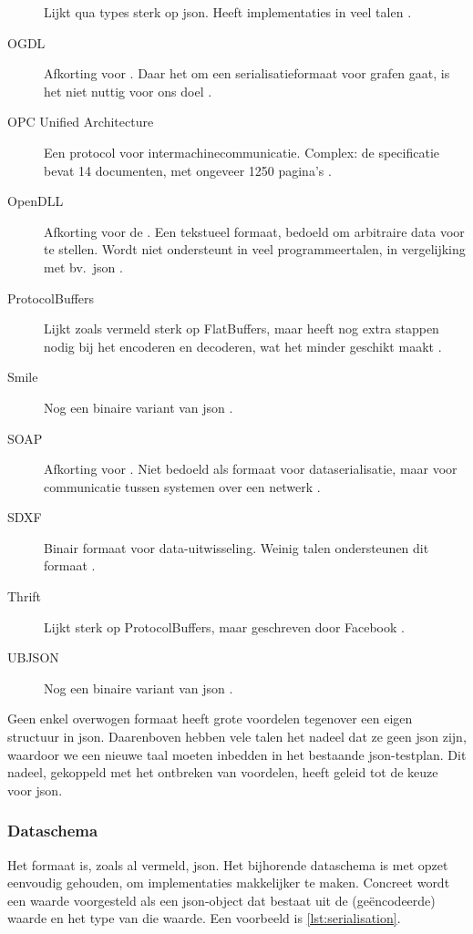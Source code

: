 \begin{description}
    Lijkt qua types sterk op json.
    Heeft implementaties in veel talen \autocite{messagepack}.
    \item[OGDL] Afkorting voor .
    Daar het om een serialisatieformaat voor grafen gaat, is het niet nuttig voor ons doel \autocite{ogdl}.
    \item[OPC Unified Architecture] Een protocol voor intermachinecommunicatie.
    Complex: de specificatie bevat 14 documenten, met ongeveer 1250 pagina's \autocite{tr62541}.
    \item[OpenDLL] Afkorting voor de .
    Een tekstueel formaat, bedoeld om arbitraire data voor te stellen.
    Wordt niet ondersteunt in veel programmeertalen, in vergelijking met bv.\ json \autocite{openddl}.
    \item[ProtocolBuffers] Lijkt zoals vermeld sterk op FlatBuffers, maar heeft nog extra stappen nodig bij het encoderen en decoderen, wat het minder geschikt maakt \autocite{protobuf}.
    \item[Smile] Nog een binaire variant van json \autocite{smile}.
    \item[SOAP] Afkorting voor .
    Niet bedoeld als formaat voor dataserialisatie, maar voor communicatie tussen systemen over een netwerk \autocite{soap}.
    \item[SDXF] Binair formaat voor data-uitwisseling.
    Weinig talen ondersteunen dit formaat \autocite{rfc3072}.
    \item[Thrift] Lijkt sterk op ProtocolBuffers, maar geschreven door Facebook \autocite{slee2007}.
    \item[UBJSON] Nog een binaire variant van json \autocite{ubjson}.

\end{description}

Geen enkel overwogen formaat heeft grote voordelen tegenover een eigen structuur in json.
Daarenboven hebben vele talen het nadeel dat ze geen json zijn, waardoor we een nieuwe taal moeten inbedden in het bestaande json-testplan.
Dit nadeel, gekoppeld met het ontbreken van voordelen, heeft geleid tot de keuze voor json.

\subsubsection{Dataschema}

Het formaat is, zoals al vermeld, json.
Het bijhorende dataschema is met opzet eenvoudig gehouden, om implementaties makkelijker te maken.
Concreet wordt een waarde voorgesteld als een json-object dat bestaat uit de (geëncodeerde) waarde en het type van die waarde.
Een voorbeeld is \cref{lst:serialisation}.

